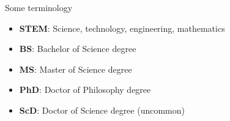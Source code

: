 \begin{frame}[fragile]{Some terminology}
\begin{itemize}
    \item {\bf STEM}: Science, technology, engineering, mathematics
    \item {\bf BS}: Bachelor of Science degree
    \item {\bf MS}: Master of Science degree
    \item {\bf PhD}: Doctor of Philosophy degree
    \item {\bf ScD}: Doctor of Science degree (uncommon)
\end{itemize}
\end{frame}

